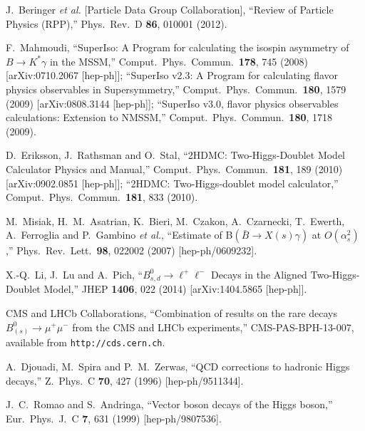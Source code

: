 \documentclass[11pt]{article}
\begin{document}
\begin{thebibliography}{99}
  J.~Beringer {\it et al.}  [Particle Data Group Collaboration],
  ``Review of Particle Physics (RPP),''
  Phys.\ Rev.\ D {\bf 86}, 010001 (2012).
  
F.~Mahmoudi,
  ``SuperIso: A Program for calculating the isospin asymmetry of $B \to K^* \gamma$ in the MSSM,''
  Comput.\ Phys.\ Commun.\  {\bf 178}, 745 (2008)
  [arXiv:0710.2067 [hep-ph]];
  ``SuperIso v2.3: A Program for calculating flavor physics observables in Supersymmetry,''
  Comput.\ Phys.\ Commun.\  {\bf 180}, 1579 (2009)
  [arXiv:0808.3144 [hep-ph]];
  ``SuperIso v3.0, flavor physics observables calculations: Extension to NMSSM,''
  Comput.\ Phys.\ Commun.\  {\bf 180}, 1718 (2009).

  D.~Eriksson, J.~Rathsman and O.~Stal,
  ``2HDMC: Two-Higgs-Doublet Model Calculator Physics and Manual,''
  Comput.\ Phys.\ Commun.\  {\bf 181}, 189 (2010)
  [arXiv:0902.0851 [hep-ph]];
  ``2HDMC: Two-Higgs-doublet model calculator,''
  Comput.\ Phys.\ Commun.\  {\bf 181}, 833 (2010).
  
  M.~Misiak, H.~M.~Asatrian, K.~Bieri, M.~Czakon, A.~Czarnecki, T.~Ewerth, A.~Ferroglia and P.~Gambino {\it et al.},
  ``Estimate of B$(\bar B \to X(s) \gamma)$ at $O(\alpha_s^2)$,''
  Phys.\ Rev.\ Lett.\  {\bf 98}, 022002 (2007)
  [hep-ph/0609232].

  X.-Q.~Li, J.~Lu and A.~Pich,
  ``$B_{s,d}^0 \to \ell^+\ell^-$ Decays in the Aligned Two-Higgs-Doublet Model,''
  JHEP {\bf 1406}, 022 (2014)
  [arXiv:1404.5865 [hep-ph]].
  
CMS and LHCb Collaborations,
``Combination of results on the rare decays $B^0_{(s)} \to \mu^+ \mu^-$ from the CMS and LHCb experiments,''
 CMS-PAS-BPH-13-007, 
 available from \verb+http://cds.cern.ch+.
 
  A.~Djouadi, M.~Spira and P.~M.~Zerwas,
  ``QCD corrections to hadronic Higgs decays,''
  Z.\ Phys.\ C {\bf 70}, 427 (1996)
  [hep-ph/9511344].
  
  J.~C.~Romao and S.~Andringa,
  ``Vector boson decays of the Higgs boson,''
  Eur.\ Phys.\ J.\ C {\bf 7}, 631 (1999)
  [hep-ph/9807536].
	

\end{thebibliography}
\end{document}
